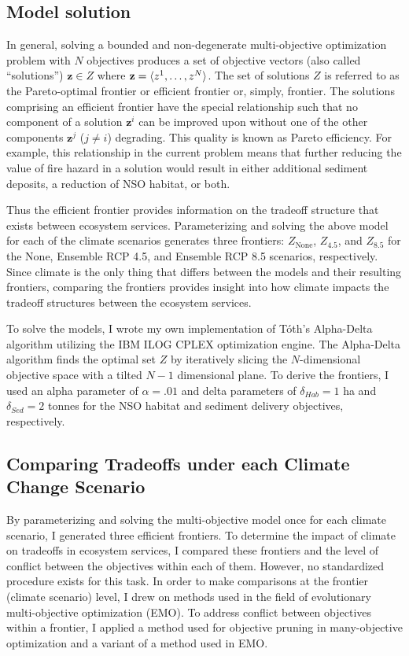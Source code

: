 \subsection{Model solution}
In general, solving a bounded and non-degenerate multi-objective optimization problem with $N$ objectives produces a set of objective vectors (also called ``solutions'') $\mathbf{z} \in Z$ where $\mathbf{z}=\braket{z^1,\ldots,z^N}$. The set of solutions $Z$ is referred to as the Pareto-optimal frontier or efficient frontier or, simply, frontier. The solutions comprising an efficient frontier have the special relationship such that no component of a solution $\mathbf{z}^i$ can be improved upon without one of the other components $\mathbf{z}^j$ ($j \neq i$) degrading. This quality is known as Pareto efficiency. For example, this relationship in the current problem means that further reducing the value of fire hazard in a solution would result in either additional sediment deposits, a reduction of NSO habitat, or both.

Thus the efficient frontier provides information on the tradeoff structure that exists between ecosystem services. Parameterizing and solving the above model for each of the climate scenarios generates three frontiers: $Z_{\text{None}}$, $Z_{4.5}$, and $Z_{8.5}$ for the None, Ensemble RCP 4.5, and Ensemble RCP 8.5 scenarios, respectively. Since climate is the only thing that differs between the models and their resulting frontiers, comparing the frontiers provides insight into how climate impacts the tradeoff structures between the ecosystem services.

To solve the models, I wrote my own implementation of T\'{o}th's Alpha-Delta algorithm \cite{TothThesis} utilizing the IBM ILOG CPLEX optimization engine. The Alpha-Delta algorithm finds the optimal set $Z$ by iteratively slicing the $N$-dimensional objective space with a tilted $N-1$ dimensional plane. To derive the frontiers, I used an alpha parameter of $\alpha = .01$ and delta parameters of $\delta_{Hab} = 1$ ha and $\delta_{Sed} = 2$ tonnes for the NSO habitat and sediment delivery objectives, respectively.

\subsection{Comparing Tradeoffs under each Climate Change Scenario}
By parameterizing and solving the multi-objective model once for each climate scenario, I generated three efficient frontiers. To determine the impact of climate on tradeoffs in ecosystem services, I compared these frontiers and the level of conflict between the objectives within each of them. However, no standardized procedure exists for this task. In order to make comparisons at the frontier (climate scenario) level, I drew on methods used in the field of evolutionary multi-objective optimization (EMO). To address conflict between objectives within a frontier, I applied a method used for objective pruning in many-objective optimization and a variant of a method used in EMO.

